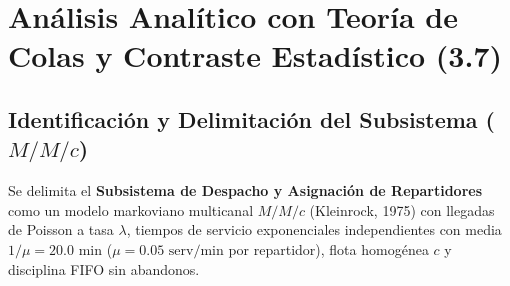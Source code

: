 \documentclass[11pt,letterpaper]{article}
\begin{document}
\section{Análisis Analítico con Teoría de Colas y Contraste Estadístico (3.7)}

\subsection{Identificación y Delimitación del Subsistema ($M/M/c$)}
Se delimita el \textbf{Subsistema de Despacho y Asignación de Repartidores} como un modelo markoviano multicanal $M/M/c$ (Kleinrock, 1975) con llegadas de Poisson a tasa $\lambda$, tiempos de servicio exponenciales independientes con media $1/\mu = 20.0\text{ min}$ ($\mu = 0.05\text{ serv/min}$ por repartidor), flota homogénea $c$ y disciplina FIFO sin abandonos.
\end{document}

